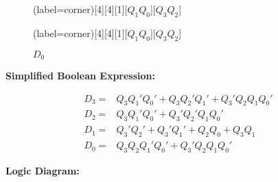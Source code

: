 \documentclass[a4paper,12pt]{article}
\begin{document}
\begin{figure}[H]
	\begin{minipage}{0.5\linewidth}
		\centering
		\begin{karnaugh-map}(label=corner)[4][4][1][$Q_1Q_0$][$Q_3Q_2$]
		\end{karnaugh-map}
		\caption*{$D_1$}
	\end{minipage}
	\begin{minipage}{0.5\linewidth}
		\centering
		\begin{karnaugh-map}(label=corner)[4][4][1][$Q_1Q_0$][$Q_3Q_2$]
		\end{karnaugh-map}
		\caption*{$D_0$}
	\end{minipage}
\end{figure}

\textbf{Simplified Boolean Expression:}

\begin{align*}
	D_3 =& Q_3Q_1'Q_0' + Q_3Q_2'Q_1' + Q_3'Q_2Q_1Q_0' \\
	D_2 =& Q_3Q_1'Q_0' + Q_3'Q_2'Q_1Q_0' \\
	D_1 =& Q_3'Q_2' + Q_3'Q_1' + Q_2Q_0 + Q_3Q_1 \\
	D_0 =& Q_3Q_2Q_1'Q_0' + Q_3'Q_2Q_1Q_0'
\end{align*}

\newpage
\textbf{Logic Diagram:}
\end{document}
